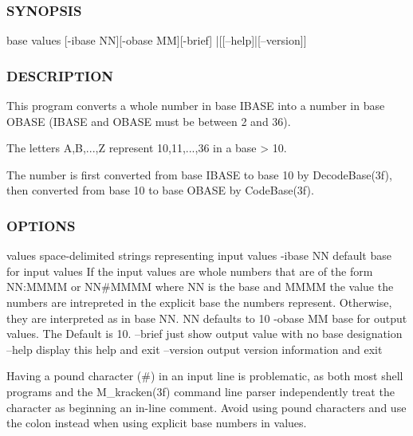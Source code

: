 \subsubsection*{S\+Y\+N\+O\+P\+S\+IS}

\begin{DoxyVerb}base values [-ibase NN][-obase MM][-brief] |[[--help]|[--version]]
\end{DoxyVerb}


\subsubsection*{D\+E\+S\+C\+R\+I\+P\+T\+I\+ON}

\begin{DoxyVerb}This program converts a whole number in base IBASE into a number in base OBASE
(IBASE and OBASE must be between 2 and 36).

The letters A,B,...,Z represent 10,11,...,36 in a base > 10.

The number is first converted from base IBASE to base 10 by DecodeBase(3f),
then converted from base 10 to base OBASE by CodeBase(3f).
\end{DoxyVerb}


\subsubsection*{O\+P\+T\+I\+O\+NS}

\begin{DoxyVerb} values     space-delimited strings representing input values
 -ibase NN  default base for input values
            If the input values are whole numbers that are of the
            form NN:MMMM or NN#MMMM where NN is the base and MMMM the
            value the numbers are intrepreted in the explicit base
            the numbers represent. Otherwise, they are interpreted
            as in base NN. NN defaults to 10
 -obase MM  base for output values. The Default is 10.
 --brief    just show output value with no base designation
 --help     display this help and exit
 --version  output version information and exit

 Having a pound character (#) in an input line is problematic,
 as both most shell programs and the M_kracken(3f) command line
 parser independently treat the character as beginning an in-line
 comment. Avoid using pound characters and use the colon instead when
 using explicit base numbers in values.
\end{DoxyVerb}


